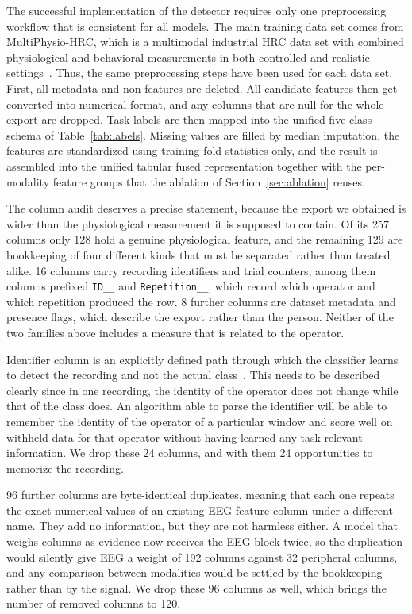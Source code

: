 \documentclass[a4paper,twoside]{article}
\begin{document}
\noindent The successful implementation of the detector requires only one preprocessing workflow that is consistent for all models. The main training data set comes from MultiPhysio-HRC, which is a multimodal industrial \ac{HRC} data set with combined physiological and behavioral measurements in both controlled and realistic settings~\cite{bussolan2025multiphysiohrc}. Thus, the same preprocessing steps have been used for each data set. First, all metadata and non-features are deleted. All candidate features then get converted into numerical format, and any columns that are null for the whole export are dropped. Task labels are then mapped into the unified five-class schema of Table~\ref{tab:labels}. Missing values are filled by median imputation, the features are standardized using training-fold statistics only, and the result is assembled into the unified tabular fused representation together with the per-modality feature groups that the ablation of Section~\ref{sec:ablation} reuses.

The column audit deserves a precise statement, because the export we obtained is wider than the physiological measurement it is supposed to contain. Of its 257 columns only 128 hold a genuine physiological feature, and the remaining 129 are bookkeeping of four different kinds that must be separated rather than treated alike. 16 columns carry recording identifiers and trial counters, among them columns prefixed \texttt{ID\_\_} and \texttt{Repetition\_\_}, which record which operator and which repetition produced the row. 8 further columns are dataset metadata and presence flags, which describe the export rather than the person. Neither of the two families above includes a measure that is related to the operator.

Identifier column is an explicitly defined path through which the classifier learns to detect the recording and not the actual class~\cite{brookshire2024leakage}. This needs to be described clearly since in one recording, the identity of the operator does not change while that of the class does. An algorithm able to parse the identifier will be able to remember the identity of the operator of a particular window and score well on withheld data for that operator without having learned any task relevant information. We drop these 24 columns, and with them 24 opportunities to memorize the recording.

96 further columns are byte-identical duplicates, meaning that each one repeats the exact numerical values of an existing \ac{EEG} feature column under a different name. They add no information, but they are not harmless either. A model that weighs columns as evidence now receives the \ac{EEG} block twice, so the duplication would silently give \ac{EEG} a weight of 192 columns against 32 peripheral columns, and any comparison between modalities would be settled by the bookkeeping rather than by the signal. We drop these 96 columns as well, which brings the number of removed columns to 120.
\end{document}
